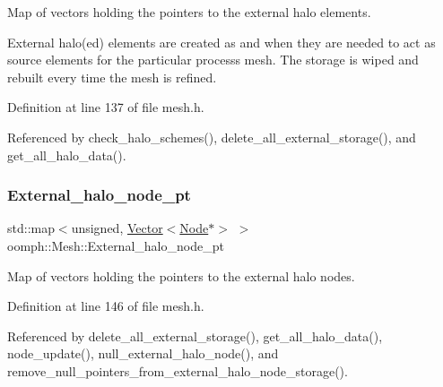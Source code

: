 Map of vectors holding the pointers to the external halo elements. 

External halo(ed) elements are created as and when they are needed to act as source elements for the particular process\textquotesingle{}s mesh. The storage is wiped and rebuilt every time the mesh is refined. 

Definition at line 137 of file mesh.\+h.



Referenced by check\+\_\+halo\+\_\+schemes(), delete\+\_\+all\+\_\+external\+\_\+storage(), and get\+\_\+all\+\_\+halo\+\_\+data().

\mbox{\label{classoomph_1_1Mesh_ad30b8d9485ce49908983600293887440}} 
\subsubsection{\texorpdfstring{External\+\_\+halo\+\_\+node\+\_\+pt}{External\_halo\_node\_pt}}
{\footnotesize\ttfamily std\+::map$<$unsigned, \hyperlink{classoomph_1_1Vector}{Vector}$<$\hyperlink{classoomph_1_1Node}{Node}$\ast$$>$ $>$ oomph\+::\+Mesh\+::\+External\+\_\+halo\+\_\+node\+\_\+pt\hspace{0.3cm}{\ttfamily [protected]}}



Map of vectors holding the pointers to the external halo nodes. 



Definition at line 146 of file mesh.\+h.



Referenced by delete\+\_\+all\+\_\+external\+\_\+storage(), get\+\_\+all\+\_\+halo\+\_\+data(), node\+\_\+update(), null\+\_\+external\+\_\+halo\+\_\+node(), and remove\+\_\+null\+\_\+pointers\+\_\+from\+\_\+external\+\_\+halo\+\_\+node\+\_\+storage().

\mbox{\label{classoomph_1_1Mesh_a3a031fedb3ebe4762e09c0416f2eaca2}} 
